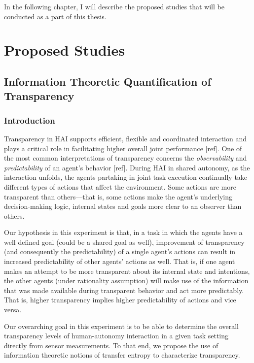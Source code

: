 \documentclass[12pt]{article}
\begin{document}
In the following chapter, I will describe the proposed studies that will be conducted as a part of this thesis. 

\pagebreak
\section{Proposed Studies}
\subsection{Information Theoretic Quantification of  Transparency}

\subsubsection{Introduction}
Transparency in HAI supports efficient, flexible and coordinated interaction and plays a critical role in facilitating higher overall joint performance [ref]. One of the most common interpretations of transparency concerns the \textit{observability} and \textit{predictability} of an agent's behavior [ref]. During HAI in shared autonomy, as the interaction unfolds, the agents partaking in joint task execution continually take different types of actions that affect the environment. Some actions are more transparent than others---that is, some actions make the agent's underlying decision-making logic, internal states and goals more clear to an observer than others. 

Our hypothesis in this experiment is that, in a task in which the agents have a well defined goal (could be a shared goal as well), improvement of transparency (and consequently the predictability) of a single agent's actions can result in increased predictability of other agents' actions as well. That is, if one agent makes an attempt to be more transparent about its internal state and intentions, the other agents (under rationality assumption) will make use of the information that was made available during transparent behavior and act more predictably. That is, higher transparency implies higher predictability of actions and vice versa.  

Our overarching goal in this experiment is to be able to determine the overall transparency levels of human-autonomy interaction in a given task setting directly from sensor measurements. To that end, we propose the use of information theoretic notions of transfer entropy to characterize transparency. 
%
%
\end{document}
